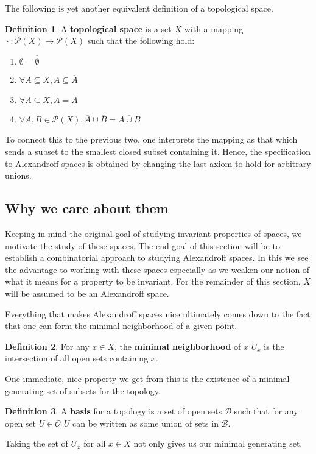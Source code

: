 \documentclass[paper=a4, fontsize=11pt]{scrartcl} %
\numberwithin{equation}{section} %
\numberwithin{figure}{section} %
\numberwithin{table}{section} %
\theoremstyle{definition}
\newtheorem{definition}{Definition}[section]
\theoremstyle{remark}
\begin{document}
The following is yet another equivalent definition of a topological space.
\begin{definition}
  A \textbf{topological space} is a set $X$ with a mapping $\overline{\cdot}:\mathcal{P}\left( X \right)\rightarrow \mathcal{P}\left( X \right)$ such that the following hold:
  \begin{enumerate}
    \item $\emptyset=\overline{\emptyset}$
    \item $\forall A\subseteq X, A\subseteq \overline{A}$
    \item $\forall A\subseteq X, \overline{\overline{A}}=\overline{A}$
    \item $\forall A,B\in \mathcal{P}\left( X \right),\overline{A}\cup\overline{B}=\overline{A\cup B}$
  \end{enumerate}
\end{definition}
To connect this to the previous two, one interprets the mapping as that which sends a subset to the smallest closed subset containing it.
Hence, the specification to Alexandroff spaces is obtained by changing the last axiom to hold for arbitrary unions.

\subsection{Why we care about them}

\indent
Keeping in mind the original goal of studying invariant properties of spaces, we motivate the study of these spaces.
The end goal of this section will be to establish a combinatorial approach to studying Alexandroff spaces.
In this we see the advantage to working with these spaces especially as we weaken our notion of what it means for a property to be invariant.
For the remainder of this section, $X$ will be assumed to be an Alexandroff space.


\indent
Everything that makes Alexandroff spaces nice ultimately comes down to the fact that one can form the minimal neighborhood of a given point.
\begin{definition}
  For any $x\in X$, the \textbf{minimal neighborhood} of $x$ $U_x$ is the intersection of all open sets containing $x$.  
\end{definition}

\indent
One immediate, nice property we get from this is the existence of a minimal generating set of subsets for the topology.
\begin{definition}
  A \textbf{basis} for a topology is a set of open sets $\mathcal{B}$ such that for any open set $U\in \mathcal{O}$ $U$ can be written as some union of sets in $\mathcal{B}$.
\end{definition}
Taking the set of $U_x$ for all $x\in X$ not only gives us our minimal generating set.
\end{document}
